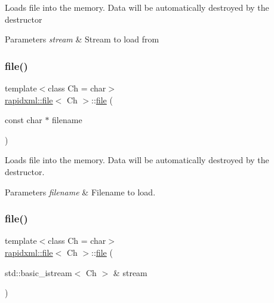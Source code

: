 Loads file into the memory. Data will be automatically destroyed by the destructor 
\begin{DoxyParams}{Parameters}
{\em stream} & Stream to load from \\
\hline
\end{DoxyParams}
\mbox{\label{classrapidxml_1_1file_ae881a3cab1fe7152d45c92a8d7606cb3}} 
\subsubsection{\texorpdfstring{file()}{file()}\hspace{0.1cm}{\footnotesize\ttfamily [3/4]}}
{\footnotesize\ttfamily template$<$class Ch  = char$>$ \\
\mbox{\hyperlink{classrapidxml_1_1file}{rapidxml\+::file}}$<$ Ch $>$\+::\mbox{\hyperlink{classrapidxml_1_1file}{file}} (\begin{DoxyParamCaption}\item[{const char $\ast$}]{filename }\end{DoxyParamCaption})\hspace{0.3cm}{\ttfamily [inline]}}

Loads file into the memory. Data will be automatically destroyed by the destructor. 
\begin{DoxyParams}{Parameters}
{\em filename} & Filename to load. \\
\hline
\end{DoxyParams}
\mbox{\label{classrapidxml_1_1file_a90707ccd991cc392dcf4bef37eed9d1f}} 
\subsubsection{\texorpdfstring{file()}{file()}\hspace{0.1cm}{\footnotesize\ttfamily [4/4]}}
{\footnotesize\ttfamily template$<$class Ch  = char$>$ \\
\mbox{\hyperlink{classrapidxml_1_1file}{rapidxml\+::file}}$<$ Ch $>$\+::\mbox{\hyperlink{classrapidxml_1_1file}{file}} (\begin{DoxyParamCaption}\item[{std\+::basic\+\_\+istream$<$ Ch $>$ \&}]{stream }\end{DoxyParamCaption})\hspace{0.3cm}{\ttfamily [inline]}}

